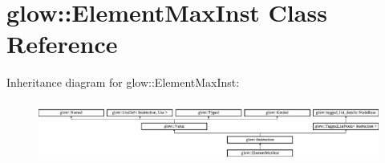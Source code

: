 \hypertarget{classglow_1_1_element_max_inst}{}\section{glow\+:\+:Element\+Max\+Inst Class Reference}
\label{classglow_1_1_element_max_inst}
Inheritance diagram for glow\+:\+:Element\+Max\+Inst\+:\begin{figure}[H]
\begin{center}
\leavevmode
\includegraphics[height=1.991111cm]{classglow_1_1_element_max_inst}
\end{center}
\end{figure}
